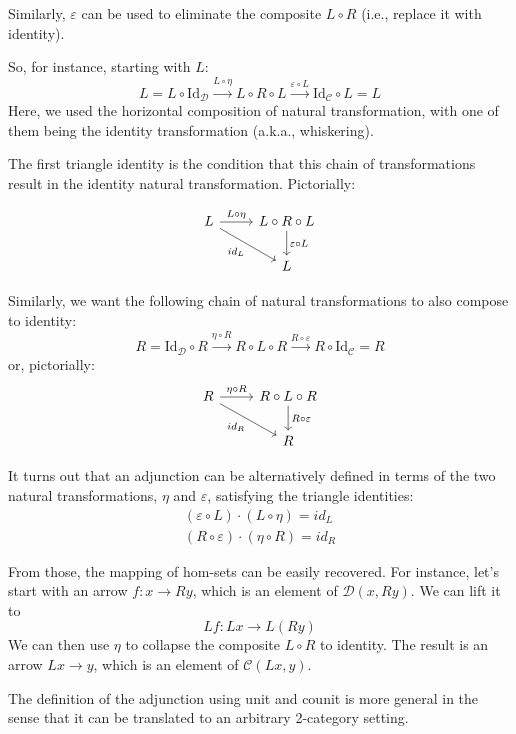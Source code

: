 \documentclass[DaoFP]{subfiles}
\begin{document}
Similarly, $\varepsilon$ can be used to eliminate the composite $L \circ R$ (i.e., replace it with identity). 

So, for instance, starting with $L$:
\[ L = L \circ \text{Id}_{\mathcal{D}} \xrightarrow{L \circ \eta} L \circ R \circ L \xrightarrow{\varepsilon \circ L} \text{Id}_{\mathcal{C}} \circ L = L \]
Here, we used the horizontal composition of natural transformation, with one of them being the identity transformation (a.k.a., whiskering).

The first triangle identity is the condition that this chain of transformations result in the identity natural transformation. Pictorially:

\[
 \begin{tikzcd}
 L
 \arrow[r, "L \circ \eta"]
 \arrow[rd, "id_L"']
 & L \circ R \circ L
 \arrow[d, "\varepsilon \circ L"]
 \\
 & L
  \end{tikzcd}
\]

Similarly, we want the following chain of natural transformations to also compose to identity:
\[ R = \text{Id}_{\mathcal{D}} \circ R \xrightarrow{\eta \circ R} R \circ L \circ R \xrightarrow{R \circ \varepsilon} R \circ \text{Id}_{\mathcal{C}} = R \]
or, pictorially:
\[
 \begin{tikzcd}
 R
 \arrow[r, "\eta \circ R"]
 \arrow[rd, "id_R"']
 & R \circ L \circ R
 \arrow[d, "R \circ \varepsilon"]
 \\
 & R
  \end{tikzcd}
\]

It turns out that an adjunction can be alternatively defined in terms of the two natural transformations, $\eta$ and $\varepsilon$, satisfying the  triangle identities:
\begin{align*}
(\varepsilon \circ L) \cdot (L \circ \eta) = id_L \\
(R \circ \varepsilon) \cdot (\eta \circ R) = id_R
\end{align*}

From those, the mapping of hom-sets can be easily recovered. For instance, let's start with an arrow $f \colon x \to R y$, which is an element of $\mathcal{D}( x , R y)$. We can lift it to 
\[L f \colon L x \to L (R y)\]
We can then use $\eta$ to collapse the composite $L \circ R$ to identity. The result is an arrow $L x \to y$, which is an element of $ \mathcal{C} (L x, y)$.


The definition of the adjunction using unit and counit is more general in the sense that it can be translated to an arbitrary 2-category setting. 
\end{document}
